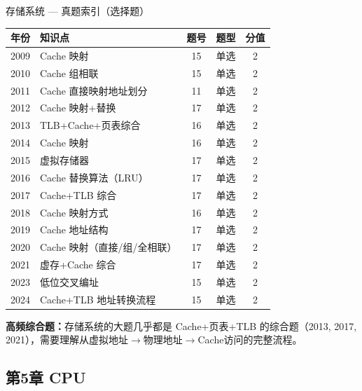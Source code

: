 \begin{tablebox}{存储系统 — 真题索引（选择题）}
\centering
\begin{tabular}{|c|l|c|c|c|}
\hline
年份 & 知识点 & 题号 & 题型 & 分值 \\
\hline
2009 & Cache 映射 & 15 & 单选 & 2 \\
2010 & Cache 组相联 & 15 & 单选 & 2 \\
2011 & Cache 直接映射地址划分 & 11 & 单选 & 2 \\
2012 & Cache 映射+替换 & 17 & 单选 & 2 \\
2013 & TLB+Cache+页表综合 & 16 & 单选 & 2 \\
2014 & Cache 映射 & 16 & 单选 & 2 \\
2015 & 虚拟存储器 & 17 & 单选 & 2 \\
2016 & Cache 替换算法（LRU）& 17 & 单选 & 2 \\
2017 & Cache+TLB 综合 & 17 & 单选 & 2 \\
2018 & Cache 映射方式 & 16 & 单选 & 2 \\
2019 & Cache 地址结构 & 17 & 单选 & 2 \\
2020 & Cache 映射（直接/组/全相联）& 17 & 单选 & 2 \\
2021 & 虚存+Cache 综合 & 17 & 单选 & 2 \\
2023 & 低位交叉编址 & 15 & 单选 & 2 \\
2024 & Cache+TLB 地址转换流程 & 15 & 单选 & 2 \\
\hline
\end{tabular}
\end{tablebox}

\noindent\textbf{高频综合题：}存储系统的大题几乎都是 Cache+页表+TLB 的综合题（2013, 2017, 2021），需要理解从虚拟地址$\to$物理地址$\to$Cache访问的完整流程。

\subsection*{第5章 CPU}

